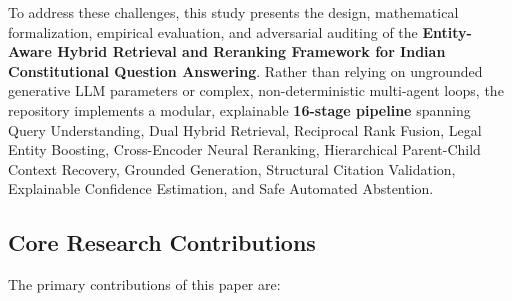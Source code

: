 \documentclass[10pt,twocolumn]{article}
\begin{document}
To address these challenges, this study presents the design, mathematical formalization, empirical evaluation, and adversarial auditing of the \textbf{Entity-Aware Hybrid Retrieval and Reranking Framework for Indian Constitutional Question Answering}. Rather than relying on ungrounded generative LLM parameters or complex, non-deterministic multi-agent loops, the repository implements a modular, explainable \textbf{16-stage pipeline} spanning Query Understanding, Dual Hybrid Retrieval, Reciprocal Rank Fusion, Legal Entity Boosting, Cross-Encoder Neural Reranking, Hierarchical Parent-Child Context Recovery, Grounded Generation, Structural Citation Validation, Explainable Confidence Estimation, and Safe Automated Abstention.

\subsection{Core Research Contributions}
The primary contributions of this paper are:
\end{document}
